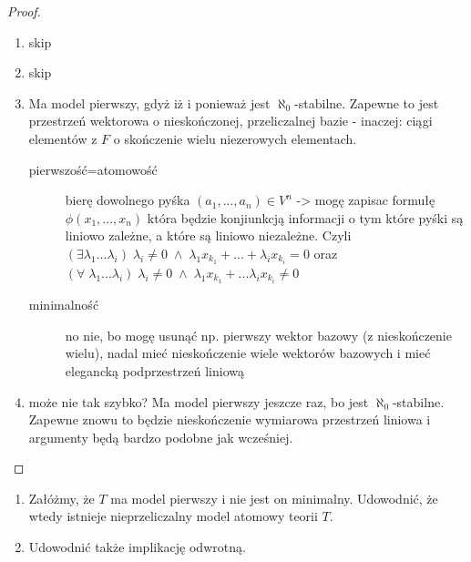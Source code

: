 \begin{proof}
\begin{enumerate}
      \textbf{Brak typów izolowanych} załóżmy nie wprost, że $(a_1,...,a_n)\in 2^\omega$ ma typ izolowany przez pewną formułę $\psi(x_1,...,x_n)=\bigwedge P_{n_k}(x_{i_k})\;\land\;\bigwedge \neg P_{n_j}(x_{i_j})$. Niech $N$ będzie największym indeksem występującym w formule $\psi$. Wtedy krotka 
      $$b_i=\begin{cases}a_i & i \leq N\\ -a_i & i > N \end{cases}$$
      również spełnia $\psi$. Czyli $\psi\in tp(a_1,...,a_n)$ oraz $\psi\in tp(b_1,...,b_n)$, co by oznaczało że te typy są takie same, ale nie są - sprzeczność.
    \item skip
    \item skip
    \item Ma model pierwszy, gdyż iż i ponieważ jest $\aleph_0$-stabilne. Zapewne to jest przestrzeń wektorowa o nieskończonej, przeliczalnej bazie - inaczej: ciągi elementów z $F$ o skończenie wielu niezerowych elementach.
      \begin{description}
        \item[pierwszość=atomowość] bierę dowolnego pyśka $(a_1,...,a_n)\in V^n$ -> mogę zapisac formułę $\phi(x_1,...,x_n)$ która będzie konjiunkcją informacji o tym które pyśki są liniowo zależne, a które są liniowo niezależne. Czyli $(\exists \lambda_1...\lambda_i)\;\lambda_i\neq 0 \;\land\;\lambda_1x_{k_1}+...+\lambda_ix_{k_i}=0$ oraz $(\forall\;\lambda_1...\lambda_i)\; \lambda_i\neq 0\;\land\;\lambda_1x_{k_1}+...\lambda_ix_{k_i}\neq 0$
        \item[minimalność] no nie, bo mogę usunąć np. pierwszy wektor bazowy (z nieskończenie wielu), nadal mieć nieskończenie wiele wektorów bazowych i mieć elegancką podprzestrzeń liniową
      \end{description}
    \item \color{red} może nie tak szybko? Ma model pierwszy jeszcze raz, bo jest $\aleph_0$-stabilne. Zapewne znowu to będzie nieskończenie wymiarowa przestrzeń liniowa i argumenty będą bardzo podobne jak wcześniej.
  \end{enumerate}
\end{proof}

\begin{zadanie}
  \begin{enumerate}
    \item Załóżmy, że $T$ ma model pierwszy i nie jest on minimalny. Udowodnić, że wtedy istnieje nieprzeliczalny model atomowy teorii $T$.
    \item Udowodnić także implikację odwrotną.
  \end{enumerate}
\end{zadanie}

